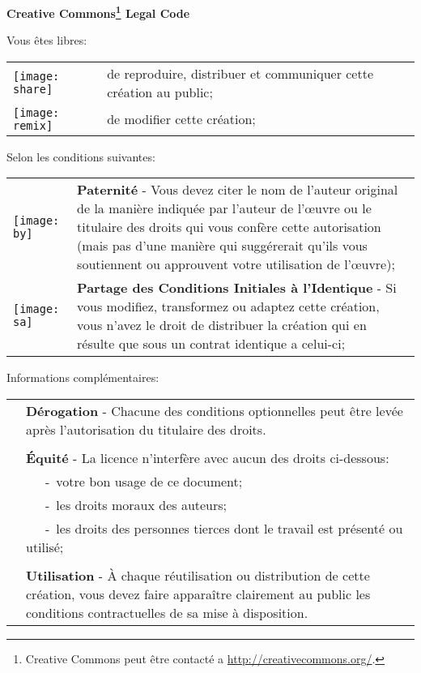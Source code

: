 \begin{center} \textbf{\LARGE{Creative Commons\footnote{Creative Commons peut être contacté a \url{http://creativecommons.org/}.} Legal Code}} \end{center}
\vspace{1cm}

\large Vous êtes libres:
\normalsize

\begin{center}
  \begin{tabular}{p{1cm} p{12cm}}
    \texttt{[image: share]} & de reproduire, distribuer et communiquer cette création au public;\\
    \texttt{[image: remix]} & de modifier cette création;\\
  \end{tabular}
\end{center}

\large Selon les conditions suivantes:
\normalsize

\begin{center}
  \begin{tabular}{p{1cm} p{12cm}}
    \texttt{[image: by]} & \textbf{Paternité} - Vous devez citer le nom de l'auteur original
    de la manière indiquée par l'auteur de l'œuvre ou le titulaire des
    droits qui vous confère cette autorisation (mais pas d'une manière
    qui suggérerait qu'ils vous soutiennent ou approuvent votre
    utilisation de l'œuvre);\\
    \texttt{[image: sa]} & \textbf{Partage des Conditions Initiales à l'Identique} -  Si vous
    modifiez, transformez ou adaptez cette création, vous n'avez le
    droit de distribuer la création qui en résulte que sous un contrat
    identique a celui-ci;\\
  \end{tabular}
\end{center}

\large Informations complémentaires:
\normalsize

\begin{tabular}{p{1cm} p{12cm}}
  \\
  & \textbf{Dérogation} - 
  Chacune des conditions optionnelles peut être levée après l'autorisation du titulaire des droits.\\
  \\
  & \textbf{Équité} - La licence n'interfère avec aucun des droits ci-dessous:\\
  & ~~~-~votre bon usage de ce document;\\
  & ~~~-~les droits moraux des auteurs;\\
  & ~~~-~les droits des personnes tierces dont le travail est présenté ou utilisé;\\
  \\
  & \textbf{Utilisation} - À chaque réutilisation ou distribution de cette création, vous devez faire apparaître clairement au public les conditions contractuelles de sa mise à disposition.
\end{tabular}

